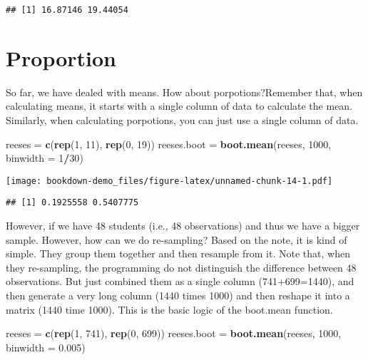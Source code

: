 \documentclass[]{book}
\newenvironment{Shaded}{\begin{snugshade}}{\end{snugshade}}
\newcommand{\DataTypeTok}[1]{\textcolor[rgb]{0.13,0.29,0.53}{#1}}
\newcommand{\DecValTok}[1]{\textcolor[rgb]{0.00,0.00,0.81}{#1}}
\newcommand{\FloatTok}[1]{\textcolor[rgb]{0.00,0.00,0.81}{#1}}
\newcommand{\KeywordTok}[1]{\textcolor[rgb]{0.13,0.29,0.53}{\textbf{#1}}}
\newcommand{\NormalTok}[1]{#1}
\newcommand{\OperatorTok}[1]{\textcolor[rgb]{0.81,0.36,0.00}{\textbf{#1}}}
\newcommand{\StringTok}[1]{\textcolor[rgb]{0.31,0.60,0.02}{#1}}
\begin{document}
\begin{verbatim}
## [1] 16.87146 19.44054
\end{verbatim}

\hypertarget{proportion}{%
\section{Proportion}\label{proportion}}

So far, we have dealed with means. How about porpotions?Remember that, when calculating means, it starts with a single column of data to calculate the mean. Similarly, when calculating porpotions, you can just use a single column of data.

\begin{Shaded}
\begin{Highlighting}[]
\NormalTok{reeses =}\StringTok{ }\KeywordTok{c}\NormalTok{(}\KeywordTok{rep}\NormalTok{(}\DecValTok{1}\NormalTok{, }\DecValTok{11}\NormalTok{), }\KeywordTok{rep}\NormalTok{(}\DecValTok{0}\NormalTok{, }\DecValTok{19}\NormalTok{))}
\NormalTok{reeses.boot =}\StringTok{ }\KeywordTok{boot.mean}\NormalTok{(reeses, }\DecValTok{1000}\NormalTok{, }\DataTypeTok{binwidth =} \DecValTok{1}\OperatorTok{/}\DecValTok{30}\NormalTok{)}
\end{Highlighting}
\end{Shaded}

\texttt{[image: bookdown-demo\_files/figure-latex/unnamed-chunk-14-1.pdf]}

\begin{verbatim}
## [1] 0.1925558 0.5407775
\end{verbatim}

However, if we have 48 students (i.e., 48 observations) and thus we have a bigger sample. However, how can we do re-sampling? Based on the note, it is kind of simple. They group them together and then resample from it. Note that, when they re-sampling, the programming do not distinguish the difference between 48 observations. But just combined them as a single column (741+699=1440), and then generate a very long column (1440 times 1000) and then reshape it into a matrix (1440 time 1000). This is the basic logic of the boot.mean function.

\begin{Shaded}
\begin{Highlighting}[]
\NormalTok{reeses =}\StringTok{ }\KeywordTok{c}\NormalTok{(}\KeywordTok{rep}\NormalTok{(}\DecValTok{1}\NormalTok{, }\DecValTok{741}\NormalTok{), }\KeywordTok{rep}\NormalTok{(}\DecValTok{0}\NormalTok{, }\DecValTok{699}\NormalTok{))}
\NormalTok{reeses.boot =}\StringTok{ }\KeywordTok{boot.mean}\NormalTok{(reeses, }\DecValTok{1000}\NormalTok{, }\DataTypeTok{binwidth =} \FloatTok{0.005}\NormalTok{)}
\end{Highlighting}
\end{Shaded}
\end{document}
